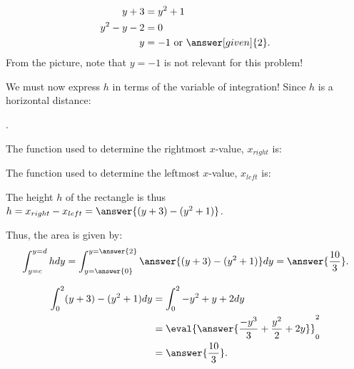 \documentclass{ximera}
\begin{document}
\begin{exercise}
\begin{exercise}
\begin{exercise}
\begin{exercise}
\begin{hint}
   \begin{align*}
    y+3 &= y^2 +1\\
  y^2-y-2 &= 0\\
    y &= -1 \text{ or }\answer[given]{2}.
  \end{align*}
  From the picture, note that $y=-1$ is not relevant for this problem!
\end{hint}

We must now express $h$ in terms of the variable of integration!  Since $h$ is a horizontal distance: 

\begin{multipleChoice}
.
\end{multipleChoice}

\begin{exercise}

The function used to determine the rightmost $x$-value, $x_{right}$ is:
\begin{multipleChoice}
\end{multipleChoice}

The function used to determine  the leftmost $x$-value, $x_{left}$ is:
\begin{multipleChoice}
\end{multipleChoice}

The height $h$ of the rectangle is thus $h=x_{right}-x_{left} = \answer{(y+3)-(y^2+1)}$.


\begin{exercise}

Thus, the area is given by:
  \[
 \int_{y=c}^{y=d} h dy =  \int_{y=\answer{0}}^{y=\answer{2}} \answer{(y+3) - (y^2+1)} dy = \answer{\frac{10}{3}}.
  \]
  \begin{hint}
    \begin{align*}
      \int_0^2 (y+3) - (y^2+1) dy &= \int_0^2 -y^2+y+2 dy\\
      &=\eval{\answer{\frac{-y^3}{3} + \frac{y^2}{2}+2y}}_0^2\\
      &=\answer{\frac{10}{3}}.
    \end{align*}
  \end{hint}

\end{exercise}
\end{exercise}
\end{exercise}
\end{exercise}
\end{exercise}
\end{exercise}
\end{document}
